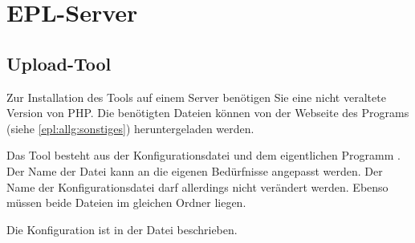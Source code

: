 \part{EPL-Server}\label{server}
\chapter{Upload-Tool}\label{server:upload}
Zur Installation des Tools auf einem Server benötigen Sie eine nicht veraltete Version von PHP.
Die benötigten Dateien können von der Webseite des Programs (siehe \cref{epl:allg:sonstiges}) heruntergeladen werden.

Das Tool besteht aus der Konfigurationsdatei  und dem eigentlichen Programm .
Der Name der Datei  kann an die eigenen Bedürfnisse angepasst werden.
Der Name der Konfigurationsdatei darf allerdings nicht verändert werden.
Ebenso müssen beide Dateien im gleichen Ordner liegen.

Die Konfiguration ist in der Datei  beschrieben.
